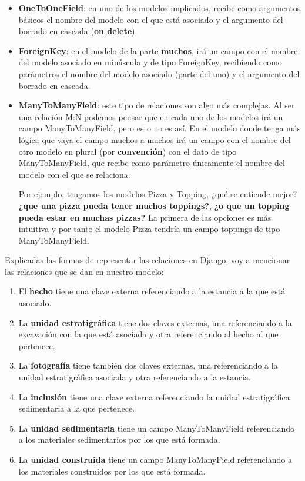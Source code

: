         \begin{itemize}
            \item \textbf{OneToOneField}: en uno de los modelos implicados, recibe como
            argumentos básicos el nombre del modelo con el que está asociado y el argumento
            del borrado en cascada (\textbf{on\underline{ }delete}).
            \item \textbf{ForeignKey}: en el modelo de la parte \textbf{muchos}, irá un campo
            con el nombre del modelo asociado en minúscula y de tipo ForeignKey, recibiendo
            como parámetros el nombre del modelo asociado (parte del uno) y el argumento del
            borrado en cascada.
            \item \textbf{ManyToManyField}: este tipo de relaciones son algo más complejas. Al
            ser una relación M:N podemos pensar que en cada uno de los modelos irá un campo
            ManyToManyField, pero esto no es así. En el modelo donde tenga más lógica que vaya
            el campo muchos a muchos irá un campo con el nombre del otro modelo en plural (por
            \textbf{convención}) con el dato de tipo ManyToManyField, que recibe como parámetro
            únicamente el nombre del modelo con el que se relaciona.

            Por ejemplo, tengamos los modelos Pizza y Topping, ¿qué se entiende mejor?
            \textbf{¿que una pizza pueda tener muchos toppings?}, \textbf{¿o que un
            topping pueda estar en muchas pizzas?} La primera de las opciones es más
            intuitiva y por tanto el modelo Pizza tendría un campo toppings de tipo
            ManyToManyField.
        \end{itemize}

    Explicadas las formas de representar las relaciones en Django, voy a mencionar las
    relaciones que se dan en nuestro modelo:

        \begin{enumerate}
            \item El \textbf{hecho} tiene una clave externa referenciando a la estancia a
            la que está asociado.
            \item La \textbf{unidad estratigráfica} tiene dos claves externas, una
            referenciando a la excavación con la que está asociada y otra referenciando al
            hecho al que pertenece.
            \item La \textbf{fotografía} tiene también dos claves externas, una
            referenciando a la unidad estratigráfica asociada y otra referenciando a la
            estancia.
            \item La \textbf{inclusión} tiene una clave externa referenciando la unidad
            estratigráfica sedimentaria a la que pertenece.
            \item La \textbf{unidad sedimentaria} tiene un campo ManyToManyField
            referenciando a los materiales sedimentarios por los que está formada.
            \item La \textbf{unidad construida} tiene un campo ManyToManyField referenciando a
            los materiales construidos por los que está formada.
        \end{enumerate}

